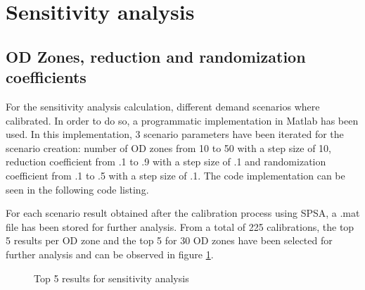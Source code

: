 \section{Sensitivity analysis}
\subsection{OD Zones, reduction and randomization coefficients}
For the sensitivity analysis calculation, different demand scenarios where calibrated. In order to do so, a programmatic implementation in Matlab has been used. In this implementation, 3 scenario parameters have been iterated for the scenario creation: number of OD zones from 10 to 50 with a step size of 10, reduction coefficient from .1 to .9 with a step size of .1 and randomization coefficient from .1 to .5 with a step size of .1. The code implementation can be seen in the following code listing.



For each scenario result obtained after the calibration process using SPSA, a .mat file has been stored for further analysis. From a total of 225 calibrations, the top 5 results per OD zone and the top 5 for 30 OD zones have been selected for further analysis and can be observed in figure \ref{fig:top-5-sensitivity}.

\begin{figure}[htpb]
  \centering
  \caption{Top 5 results for sensitivity analysis}
  \label{fig:top-5-sensitivity}
\end{figure}

